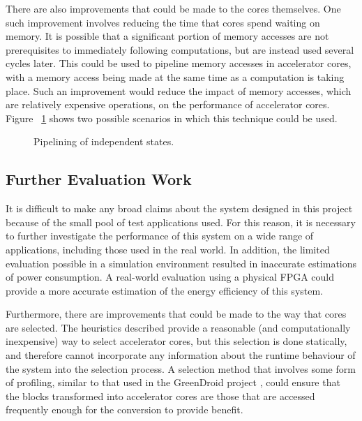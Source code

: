 \documentclass{UoYCSproject}
\begin{document}
There are also improvements that could be made to the cores themselves. One such improvement involves reducing the time
that cores spend waiting on memory. It is possible that a significant portion of memory accesses are not prerequisites to
immediately following computations, but are instead used several cycles later. This could be used to pipeline memory accesses
in accelerator cores, with a memory access being made at the same time as a computation is taking place. Such an improvement
would reduce the impact of memory accesses, which are relatively expensive operations, on the performance of accelerator cores.
Figure ~\ref{fig:pipeliningAccelerators} shows two possible scenarios in which this technique could be used.

\begin{figure}[H]
\caption{Pipelining of independent states.}
\label{fig:pipeliningAccelerators}
\end{figure}

\subsection{Further Evaluation Work}

It is difficult to make any broad claims about the system designed in this project because of the small pool of test
applications used. For this reason, it is necessary to further investigate the performance of this system on a wide range of
applications, including those used in the real world. In addition, the limited evaluation possible in a simulation environment
resulted in inaccurate estimations of power consumption. A real-world evaluation using a physical FPGA could provide a more
accurate estimation of the energy efficiency of this system.

Furthermore, there are improvements that could be made to the way that cores are selected. The heuristics described provide
a reasonable (and computationally inexpensive) way to select accelerator cores, but this selection is done statically, and
therefore cannot incorporate any information about the runtime behaviour of the system into the selection process.
A selection method that involves some form of profiling, similar to that used in the GreenDroid project \cite{greendroid},
could ensure that the blocks transformed into accelerator cores are those that are accessed frequently enough
for the conversion to provide benefit.
\end{document}
